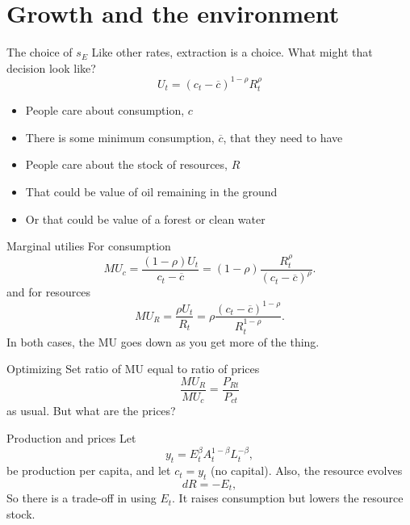 \section{Growth and the environment}
\begin{frame}{The choice of $s_E$}
Like other rates, extraction is a choice. What might that decision look like?
\begin{equation}
	U_t = (c_t-\overline{c})^{1-\rho}R_t^{\rho} \label{EQ_U_cR}
\end{equation}
\begin{itemize}
	\item People care about consumption, $c$
	\item There is some minimum consumption, $\overline{c}$, that they need to have
	\item People care about the stock of resources, $R$
	\item That could be value of oil remaining in the ground
	\item Or that could be value of a forest or clean water
\end{itemize}
\end{frame}

\begin{frame}{Marginal utilies}
For consumption
\begin{equation}
	MU_c = \frac{(1-\rho)U_t}{c_t-\overline{c}} = (1-\rho)\frac{R_t^{\rho}}{(c_t-\overline{c})^{\rho}}. \label{EQ_MUc_R}
\end{equation}
and for resources
\begin{equation}
	MU_R = \frac{\rho U_t}{R_t} = \rho \frac{(c_t-\overline{c})^{1-\rho}}{R_t^{1-\rho}}. \label{EQ_MUR_R}
\end{equation}
In both cases, the MU goes down as you get more of the thing.
\end{frame}

\begin{frame}{Optimizing}
Set ratio of MU equal to ratio of prices
\begin{equation}
	\frac{MU_R}{MU_c} = \frac{P_{Rt}}{P_{ct}}
\end{equation}
as usual. But what are the prices? 
\end{frame}

\begin{frame}{Production and prices}
Let 
\begin{equation}
	y_t = E_t^{\beta} A_t^{1-\beta} L_t^{-\beta}, \label{EQ_y_R}
\end{equation}
be production per capita, and let $c_t = y_t$ (no capital). Also, the resource evolves
\begin{equation}
	dR = - E_t, \label{EQ_dotR_utility}
\end{equation}
So there is a trade-off in using $E_t$. It raises consumption but lowers the resource stock. 
\end{frame}

